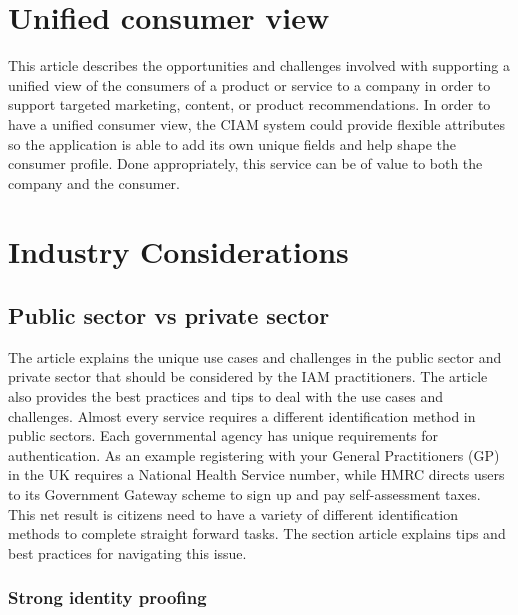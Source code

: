 \hypertarget{unified-consumer-view}{%
\section{Unified consumer view}\label{unified-consumer-view}}

This article describes the opportunities and challenges involved with
supporting a unified view of the consumers of a product or service to a
company in order to support targeted marketing, content, or product
recommendations. In order to have a unified consumer view, the CIAM
system could provide flexible attributes so the application is able to
add its own unique fields and help shape the consumer profile. Done
appropriately, this service can be of value to both the company and the
consumer.

\hypertarget{industry-considerations}{%
\section{Industry Considerations}\label{industry-considerations}}

\hypertarget{public-sector-vs-private-sector}{%
\subsection{Public sector vs private
sector}\label{public-sector-vs-private-sector}}

The article explains the unique use cases and challenges in the public
sector and private sector that should be considered by the IAM
practitioners. The article also provides the best practices and tips to
deal with the use cases and challenges. Almost every service requires a
different identification method in public sectors. Each governmental
agency has unique requirements for authentication. As an example
registering with your General Practitioners (GP) in the UK requires a
National Health Service number, while HMRC directs users to its
Government Gateway scheme to sign up and pay self-assessment taxes. This
net result is citizens need to have a variety of different
identification methods to complete straight forward tasks. The section
article explains tips and best practices for navigating this issue.

\hypertarget{strong-identity-proofing}{%
\subsubsection{Strong identity proofing}\label{strong-identity-proofing}}

